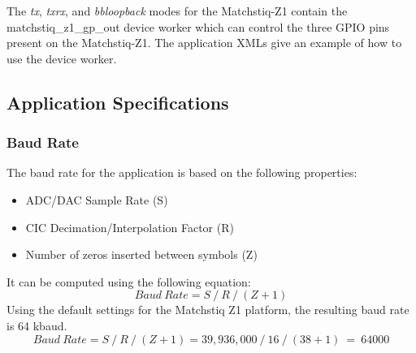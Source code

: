 \noindent The \textit{tx}, \textit{txrx}, and \textit{bbloopback} modes for the Matchstiq-Z1 contain the matchstiq\_z1\_gp\_out device worker which can control the three GPIO pins present on the Matchstiq-Z1. The application XMLs give an example of how to use the device worker.\par\medskip
\subsection{Application Specifications}
\subsubsection{Baud Rate}
The baud rate for the application is based on the following properties:
	\begin{itemize}
		\item ADC/DAC Sample Rate (S)
		\item CIC Decimation/Interpolation Factor (R)
		\item Number of zeros inserted between symbols (Z)
	\end{itemize}
It can be computed using the following equation:
	      \begin{equation} \label{eq:cic_gain}
	      	Baud\ Rate = S\ /\ R\ /\ (Z +1)
	      \end{equation}
Using the default settings for the Matchstiq Z1 platform, the resulting baud rate is 64 kbaud.
	      \begin{equation} \label{eq:cic_gain}
	      	Baud\ Rate = S\ /\ R\ /\ (Z+1) = 39,936,000 \ /\ 16\ /\ (38+1) \ =\ 64000
	      \end{equation}
